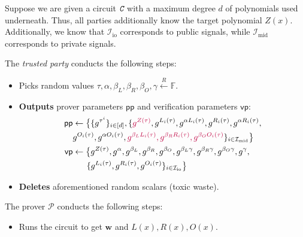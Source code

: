 \documentclass[../lecture-notes-148x210.tex]{subfiles}
\begin{document}
\begin{tcolorbox}[title=Attempt \#5: Turning SNARK into zk-SNARK,
    breakable,
    colback=blue!5!white,
    colframe=blue!75!black,
    colbacktitle=blue!25!white,
    coltitle=blue!20!black,
    fonttitle=\bfseries,
    boxrule=1.25pt,
    subtitle style={boxrule=0pt,
    colback=blue!20!white,
    colupper=blue!75!gray} ]
    \small
    Suppose we are given a circuit $\textit{\texttt{C}}$ with a maximum degree $d$ of polynomials used underneath. Thus, all parties additionally know the target polynomial $Z(x)$. Additionally, we know that $\mathcal{I}_{\text{io}}$ corresponds to public signals, while $\mathcal{I}_{\text{mid}}$ corresponds to private signals.

    The \emph{trusted party} conducts the following steps:
    \begin{itemize}[label=]
        \item Picks random values $\tau, \alpha, \beta_L, \beta_R, \beta_O, \gamma \xleftarrow{R} \mathbb{F}$.
        \item \textbf{Outputs} prover parameters $\mathsf{pp}$ and verification parameters $\mathsf{vp}$:
        \begin{align*}
            \mathsf{pp} &\gets \big\{\{g^{\tau^i}\}_{i \in [d]}, \{\textcolor{purple}{g^{Z(\tau)}}, g^{L_i(\tau)}, g^{\alpha L_i(\tau)}, g^{R_i(\tau)}, g^{\alpha R_i(\tau)}, \\ 
                        & g^{O_i(\tau)}, g^{\alpha O_i(\tau)}, \textcolor{purple}{g^{\beta_LL_i(\tau)}, g^{\beta_RR_i(\tau)}, g^{\beta_OO_i(\tau)}}\}_{i \in \mathcal{I}_{\text{mid}}}\big\} \\
            \mathsf{vp} &\gets \big\{ g^{Z(\tau)}, g^{\alpha}, g^{\beta_L}, g^{\beta_R}, g^{\beta_O}, g^{\beta_L\gamma}, g^{\beta_R\gamma}, g^{\beta_O\gamma}, g^{\gamma}, \\
                        & \;\;\;\;\;\; \{g^{L_i(\tau)}, g^{R_i(\tau)}, g^{O_i(\tau)}\}_{i \in \mathcal{I}_{\text{io}}} \big\}
        \end{align*}
        \item \textbf{Deletes} aforementioned random scalars (toxic waste).
    \end{itemize}
    The prover $\mathcal{P}$ conducts the following steps:
    \begin{itemize}[label=]
        \item Runs the circuit to get $\mathbf{w}$ and $L(x),R(x),O(x)$.

\end{itemize}
\end{tcolorbox}
\end{document}
